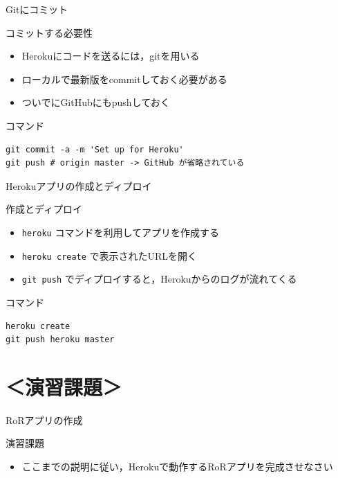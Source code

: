 \documentclass[t, aspectratio=169]{beamer}
\begin{document}
\begin{frame}[fragile,label=sec-6-3-2]{Gitにコミット}
 \begin{block}{コミットする必要性}
\begin{itemize}
\item Herokuにコードを送るには，gitを用いる
\item ローカルで最新版をcommitしておく必要がある
\item ついでにGitHubにもpushしておく
\end{itemize}
\end{block}
\begin{block}{コマンド}
\begin{verbatim}
git commit -a -m 'Set up for Heroku'
git push # origin master -> GitHub が省略されている
\end{verbatim}
\end{block}
\end{frame}

\begin{frame}[fragile,label=sec-6-3-3]{Herokuアプリの作成とディプロイ}
 \begin{block}{作成とディプロイ}
\begin{itemize}
\item \texttt{heroku} コマンドを利用してアプリを作成する
\item \texttt{heroku create} で表示されたURLを開く
\item \texttt{git push} でディプロイすると，Herokuからのログが流れてくる
\end{itemize}
\end{block}
\begin{block}{コマンド}
\begin{verbatim}
heroku create
git push heroku master
\end{verbatim}
\end{block}
\end{frame}

\section{＜演習課題＞}
\label{sec-6-4}
\begin{frame}[label=sec-6-4-1]{RoRアプリの作成}
\begin{block}{演習課題}
\begin{itemize}
\item ここまでの説明に従い，Herokuで動作するRoRアプリを完成させなさい
\end{itemize}
\end{block}
\end{frame}
\end{document}
